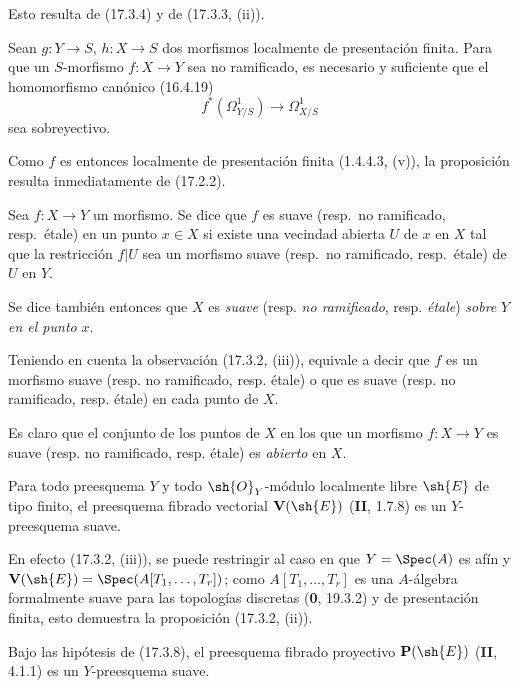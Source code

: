 Esto resulta de (17.3.4) y de (17.3.3, (ii)).

\begin{proposition}[17.3.6]
\label{IV.17.3.6}
Sean $g:Y\to S$, $h:X\to S$ dos morfismos localmente de presentación finita. Para que un $S$-morfismo $f:X\to Y$ sea no ramificado, es necesario y suficiente que el homomorfismo canónico \textup{(16.4.19)}
\[
  f^*(\varOmega_{Y/S}^1)\longrightarrow\varOmega_{X/S}^1
\]
sea sobreyectivo.
\end{proposition}

Como $f$ es entonces localmente de presentación finita (1.4.4.3, (v)), la proposición resulta inmediatamente de (17.2.2).

\begin{definition}[17.3.7]
\label{IV.17.3.7}
Sea $f:X\to Y$ un morfismo. Se dice que $f$ es suave \textup{(resp.}\ no ramificado, \textup{resp.}\ étale\textup{)} en un punto $x\in X$ si existe una vecindad abierta $U$ de $x$ en $X$ tal que la restricción $f|U$ sea un morfismo suave \textup{(resp.}\ no ramificado, \textup{resp.}\ étale\textup{)} de $U$ en $Y$.
\end{definition}

Se dice también entonces que $X$ es \emph{suave} (resp. \emph{no ramificado}, resp. \emph{étale}) \emph{sobre} $Y$ \emph{en el punto} $x$.

Teniendo en cuenta la observación (17.3.2, (iii)), equivale a decir que $f$ es un morfismo suave (resp. no ramificado, resp. étale) o que es suave (resp. no ramificado, resp. étale) en cada punto de $X$.

Es claro que el conjunto de los puntos de $X$ en los que un morfismo $f:X\to Y$ es suave (resp. no ramificado, resp. étale) es \emph{abierto} en $X$.

\begin{proposition}[17.3.8]
\label{IV.17.3.8}
Para todo preesquema $Y$ y todo $\sh{O}_Y$-módulo localmente libre $\sh{E}$ de tipo finito, el preesquema fibrado vectorial $\mathbf{V}(\sh{E})$ \textup{(\textbf{II}, 1.7.8)} es un $Y$-preesquema suave.
\end{proposition}

En efecto (17.3.2, (iii)), se puede restringir al caso en que $Y=\Spec(A)$ es afín y $\mathbf{V}(\sh{E})=\Spec(A[T_1,\ldots,T_r])$; como $A[T_1,\ldots,T_r]$ es una $A$-álgebra formalmente suave para las topologías discretas (\textbf 0, 19.3.2) y de presentación finita, esto demuestra la proposición (17.3.2, (ii)).

\begin{corollary}[17.3.9]
\label{IV.17.3.9}
Bajo las hipótesis de \textup{(17.3.8)}, el preesquema fibrado proyectivo $\mathbf{P}(\sh{E})$ \textup{(\textbf{II}, 4.1.1)} es un $Y$-preesquema suave.
\end{corollary}

